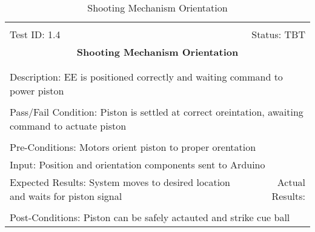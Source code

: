 \documentclass[titlepage]{article}
\begin{document}
\begin{center}%
\begin{table}[h!]
\begin{tabular}{|l r|}\hline&\\[-2mm]
	Test ID: 1.4	&Status: TBT\\[-3mm]
	\multicolumn{2}{|c|}{\textbf{\large{Shooting Mechanism Orientation}}}\\&\\\hline&\\[-3mm]
	\multicolumn{2}{|p{\textwidth}|}{Description: EE is positioned correctly and waiting command to power piston}\\[1mm]\hline&\\[-3mm]
	\multicolumn{2}{|p{\textwidth}|}{Pass/Fail Condition: Piston is settled at correct oreintation, awaiting command to actuate piston}\\[1mm]\hline&\\[-3mm]
	\multicolumn{2}{|p{\textwidth}|}{Pre-Conditions: Motors orient piston to proper orentation}\\[4mm]
	\multicolumn{2}{|p{\textwidth}|}{Input: Position and orientation components sent to Arduino}\\[2mm]\hline
	\multicolumn{1}{|p{0.49\textwidth}}{Expected Results: System moves to desired location and waits for piston signal}	&\multicolumn{1}{|p{0.45\textwidth}|}{Actual Results:}\\\hline&\\[-3mm]
	\multicolumn{2}{|p{\textwidth}|}{Post-Conditions: Piston can be safely actauted and strike cue ball}\\\hline
\end{tabular}
\caption{Shooting Mechanism Orientation}
\end{table}
\end{center}
\end{document}
